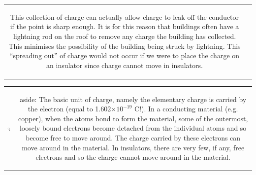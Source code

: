 \begin{tabular}{cc}
\begin{minipage}{0.85\textwidth}
\begin{note}
\begin{figure}[H]
\begin{center}
    \end{center}

 \end{figure}   

    \addtocounter{footnote}{-0}
    
      \par 
      \label{m38781*id201205}This collection of charge can actually allow charge to leak off
the conductor if the point is sharp enough. It is for this reason
that buildings often have a lightning rod on the roof to remove
any charge the building has collected. This minimises the
possibility of the building being struck by lightning. This
``spreading out'' of charge would not occur if we were to place
the charge on an insulator since charge cannot move in
insulators. \par 
	\end{note}
	\end{minipage}
	\end{tabular}
	\par
      \label{m38781*eip-509}
\begin{tabular}{cc}
	\hspace*{-50pt}\includegraphics[width=0.5in]{col11305.imgs/psbulb2.png}  & 

	\begin{minipage}{0.85\textwidth}
	\begin{note}
      {aside: }The basic unit of charge, namely the
elementary charge is carried by the
electron (equal to 1.602\begin{math}\ensuremath{\times}{10}^{-19}\end{math} C!). In a conducting material (e.g. copper), when the atoms
bond to form the material, some of the outermost, loosely bound
electrons become detached from the individual atoms and so become
free to move around. The charge carried by these electrons can
move around in the material. In insulators, there are very few, if
any, free electrons and so the charge cannot move around in the
material. 
	\end{note}
	\end{minipage}
	\end{tabular}
	\par
      \label{m38781*eip-841}
